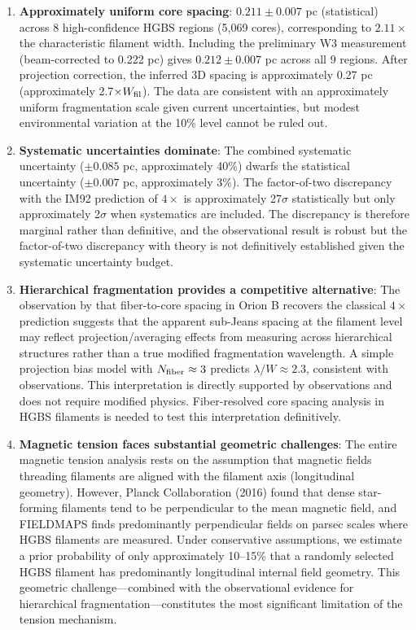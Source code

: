 \documentclass[11pt,a4paper]{article}
\begin{document}
\begin{enumerate}
    \item \textbf{Approximately uniform core spacing}: $0.211 \pm 0.007$ pc (statistical) across 8 high-confidence HGBS regions (5,069 cores), corresponding to $2.11\times$ the characteristic filament width. Including the preliminary W3 measurement (beam-corrected to 0.222 pc) gives $0.212 \pm 0.007$ pc across all 9 regions. After projection correction, the inferred 3D spacing is approximately 0.27 pc (approximately 2.7$\times W_{\rm fil}$). The data are consistent with an approximately uniform fragmentation scale given current uncertainties, but modest environmental variation at the 10\% level cannot be ruled out.

    \item \textbf{Systematic uncertainties dominate}: The combined systematic uncertainty ($\pm0.085$ pc, approximately 40\%) dwarfs the statistical uncertainty ($\pm0.007$ pc, approximately 3\%). The factor-of-two discrepancy with the IM92 prediction of $4\times$ is approximately 27$\sigma$ statistically but only approximately 2$\sigma$ when systematics are included. The discrepancy is therefore marginal rather than definitive, and the observational result is robust but the factor-of-two discrepancy with theory is not definitively established given the systematic uncertainty budget.

    \item \textbf{Hierarchical fragmentation provides a competitive alternative}: The observation by \citet{Yang2024} that fiber-to-core spacing in Orion B recovers the classical $4\times$ prediction suggests that the apparent sub-Jeans spacing at the filament level may reflect projection/averaging effects from measuring across hierarchical structures rather than a true modified fragmentation wavelength. A simple projection bias model with $N_{\rm fiber} \approx 3$ predicts $\lambda/W \approx 2.3$, consistent with observations. This interpretation is directly supported by observations and does not require modified physics. Fiber-resolved core spacing analysis in HGBS filaments is needed to test this interpretation definitively.

    \item \textbf{Magnetic tension faces substantial geometric challenges}: The entire magnetic tension analysis rests on the assumption that magnetic fields threading filaments are aligned with the filament axis (longitudinal geometry). However, Planck Collaboration (2016) found that dense star-forming filaments tend to be perpendicular to the mean magnetic field, and FIELDMAPS finds predominantly perpendicular fields on parsec scales where HGBS filaments are measured. Under conservative assumptions, we estimate a prior probability of only approximately 10--15\% that a randomly selected HGBS filament has predominantly longitudinal internal field geometry. This geometric challenge—combined with the observational evidence for hierarchical fragmentation—constitutes the most significant limitation of the tension mechanism.


\end{enumerate}
\end{document}
